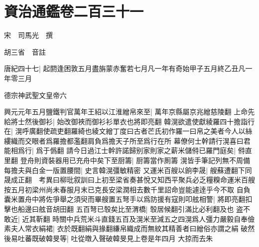 \section{資治通鑑卷二百三十一}
宋　司馬光　撰

胡三省　音註

唐紀四十七|{
	起閼逢困敦五月盡旃蒙赤奮若七月凡一年有奇始甲子五月終乙丑凡一年零三月}


德宗神武聖文皇帝六

興元元年五月鹽鐵判官萬年王紹以江淮繒帛來至|{
	萬年京縣屬京兆繒慈陵翻}
上命先給將士然後御衫|{
	始改御裌而御衫衫單衣也將即亮翻}
韓滉欲遣使獻綾羅四十擔詣行在|{
	滉呼廣翻使疏吏翻羅綺也綾文繒丁度曰古者芒氏初作羅一曰帛之美者今人以絲縷織而交眼者爲羅擔都濫翻肩負爲擔天子所至爲行在所}
幕僚何士幹請行滉喜曰君能相爲行|{
	爲于僞翻}
請今日過江士幹許諾歸别家則家之薪米儲偫已羅門庭矣|{
	偫直里翻}
登舟則資裝器用已充舟中矣下至厨籌|{
	厨籌當作厠籌}
滉皆手筆記列無不周備每擔夫與白金一版置腰間|{
	史言韓滉彊敏精密}
又運米百艘以餉李晟|{
	艘蘇遭翻下同晟成正翻　考異曰柳玭叙訓曰上初至梁省奏甚悅又知西平聚兵必乏糧糗命運米百艘按五月初梁州尚未春服月末已克長安梁潤相去數千里詔命豈能遽逹乎今不取}
自負囊米置舟中將佐爭舉之須臾而畢艘置五弩手以爲防援有寇則叩舷相警|{
	將即亮翻扣擊也船邊曰舷音胡田翻}
五百弩已彀矣比至渭橋|{
	彀居候翻引滿比必利翻及也}
盗不敢近|{
	近其靳翻}
時關中兵荒米斗直錢五百及滉米至減五之四滉爲人彊力嚴毅自奉儉素夫人常衣絹裙|{
	衣於既翻絹與掾翻縑帛織成而無紋其精善者曰繒俗亦謂之絹}
破然後易吐蕃既破韓旻等|{
	吐從暾入聲破韓旻見上卷是年四月}
大掠而去朱

